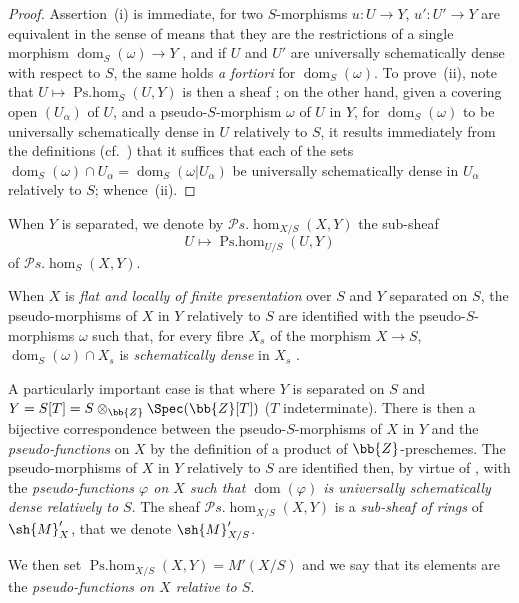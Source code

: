 \begin{proof}
Assertion~(i) is immediate, for two $S$-morphisms $u:U\to Y$, $u':U'\to Y$ are equivalent in the sense of  means that they are the restrictions of a single morphism $\operatorname{dom}_S(\omega)\to Y$ , and if $U$ and $U'$ are universally schematically dense with respect to $S$, the same holds \emph{a fortiori} for $\operatorname{dom}_S(\omega)$.
To prove~(ii), note that $U\mapsto\operatorname{Ps.hom}_S(U,Y)$ is then a sheaf ;
on the other hand, given a covering open $(U_\alpha)$ of $U$, and a pseudo-$S$-morphism $\omega$ of $U$ in $Y$, for $\operatorname{dom}_S(\omega)$ to be universally schematically dense in $U$ relatively to $S$, it results immediately from the definitions (cf.\ ) that it suffices that each of the sets $\operatorname{dom}_S(\omega)\cap U_\alpha=\operatorname{dom}_S(\omega|U_\alpha)$ be universally schematically dense in $U_\alpha$ relatively to $S$;
whence~(ii).
\end{proof}

When $Y$ is separated, we denote by $\mathscr{P}\!s.\!\operatorname{hom}_{X/S}(X,Y)$ the sub-sheaf
\[
  U\mapsto\operatorname{Ps.hom}_{U/S}(U,Y)
\]
of $\mathscr{P}\!s.\!\operatorname{hom}_S(X,Y)$.

When $X$ is \emph{flat and locally of finite presentation} over $S$ and $Y$ separated on $S$, the pseudo-morphisms of $X$ in $Y$ relatively to $S$ are identified with the pseudo-$S$-morphisms $\omega$ such that, for every fibre $X_s$ of the morphism $X\to S$, $\operatorname{dom}_S(\omega)\cap X_s$ is \emph{schematically dense} in $X_s$ .

\begin{env}[20.5.4]
\label{IV.20.5.4}
A particularly important case is that where $Y$ is separated on $S$ and $Y=S[T]=S\otimes_{\bb{Z}}\Spec(\bb{Z}[T])$ ($T$ indeterminate).
There is then a bijective correspondence between the pseudo-$S$-morphisms of $X$ in $Y$ and the \emph{pseudo-functions} on $X$  by the definition of a product of $\bb{Z}$-preschemes.
The pseudo-morphisms of $X$ in $Y$ relatively to $S$ are identified then, by virtue of , with the \emph{pseudo-functions $\varphi$ on $X$ such that $\operatorname{dom}(\varphi)$ is universally schematically dense relatively to $S$}.
The sheaf $\mathscr{P}\!s.\!\operatorname{hom}_{X/S}(X,Y)$ is a \emph{sub-sheaf of rings} of $\sh{M}'_X$, that we denote $\sh{M}'_{X/S}$.

We then set $\operatorname{Ps.hom}_{X/S}(X,Y)=M'(X/S)$ and we say that its elements are the \emph{pseudo-functions on $X$ relative to $S$}.
\end{env}

